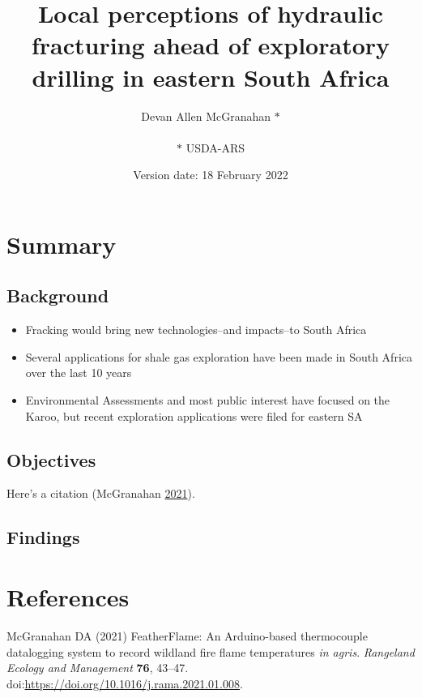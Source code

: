\documentclass[]{tufte-book}
\title{Local perceptions of hydraulic fracturing ahead of exploratory drilling
in eastern South Africa}
\author{Devan Allen McGranahan \(*\)\\
~\\
\(*\) USDA-ARS\\}
\date{Version date: 18 February 2022}
\providecommand{\tightlist}{%
  \setlength{\itemsep}{0pt}\setlength{\parskip}{0pt}}
\begin{document}
\maketitle




\hypertarget{summary}{%
\chapter{Summary}\label{summary}}

\hypertarget{background}{%
\section{Background}\label{background}}

\begin{itemize}
\tightlist
\item
  Fracking would bring new technologies--and impacts--to South Africa
\item
  Several applications for shale gas exploration have been made in South
  Africa over the last 10 years
\item
  Environmental Assessments and most public interest have focused on the
  Karoo, but recent exploration applications were filed for eastern SA
\end{itemize}

\hypertarget{objectives}{%
\section{Objectives}\label{objectives}}

Here's a citation (McGranahan
\protect\hyperlink{ref-mcgranahan2021}{2021}).

\hypertarget{findings}{%
\section{Findings}\label{findings}}

\hypertarget{references}{%
\chapter*{References}\label{references}}

\begin{adjustwidth}{}{}
\textwidth 50pc

\hypertarget{refs}{}
\leavevmode\hypertarget{ref-mcgranahan2021}{}%
McGranahan DA (2021) FeatherFlame: An Arduino-based thermocouple
datalogging system to record wildland fire flame temperatures \emph{in
agris}. \emph{Rangeland Ecology and Management} \textbf{76}, 43--47.
doi:\href{https://doi.org/https://doi.org/10.1016/j.rama.2021.01.008}{https://doi.org/10.1016/j.rama.2021.01.008}.

\end{adjustwidth}
\end{document}

